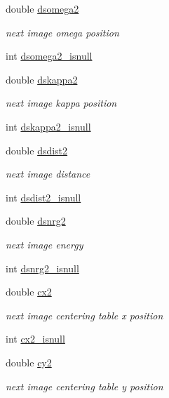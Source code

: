 \begin{DoxyCompactItemize}
double \hyperlink{structlspg__nextshot__struct_a84ae35abfa725d1bdbff5403f6384ee4}{dsomega2}
\begin{DoxyCompactList}\small\item\em next image omega position \end{DoxyCompactList}\item 
int \hyperlink{structlspg__nextshot__struct_afaf9bdf89a68e7f479969072643e55eb}{dsomega2\-\_\-isnull}
\item 
double \hyperlink{structlspg__nextshot__struct_a8571a0b95fb6ea6356fd7204b9c9e371}{dskappa2}
\begin{DoxyCompactList}\small\item\em next image kappa position \end{DoxyCompactList}\item 
int \hyperlink{structlspg__nextshot__struct_a9a7e47372f4f6e0e48a0cb3c78fa8437}{dskappa2\-\_\-isnull}
\item 
double \hyperlink{structlspg__nextshot__struct_a516827749068577217b27860a01e6041}{dsdist2}
\begin{DoxyCompactList}\small\item\em next image distance \end{DoxyCompactList}\item 
int \hyperlink{structlspg__nextshot__struct_a7fce65f4719a4a8110006f8b72eec3f7}{dsdist2\-\_\-isnull}
\item 
double \hyperlink{structlspg__nextshot__struct_ae461439c2af31255227765c0fb61850f}{dsnrg2}
\begin{DoxyCompactList}\small\item\em next image energy \end{DoxyCompactList}\item 
int \hyperlink{structlspg__nextshot__struct_aee9f8196dd9bcea832a60f2f0ea3a999}{dsnrg2\-\_\-isnull}
\item 
double \hyperlink{structlspg__nextshot__struct_a10d45763100bc59f9a5f68f1b48db6d3}{cx2}
\begin{DoxyCompactList}\small\item\em next image centering table x position \end{DoxyCompactList}\item 
int \hyperlink{structlspg__nextshot__struct_a3ad947f4efe2cb5c338244b019334749}{cx2\-\_\-isnull}
\item 
double \hyperlink{structlspg__nextshot__struct_a3644e5c3f12af18a3b426d4d4d7e16a5}{cy2}
\begin{DoxyCompactList}\small\item\em next image centering table y position \end{DoxyCompactList}\item 

\end{DoxyCompactItemize}
